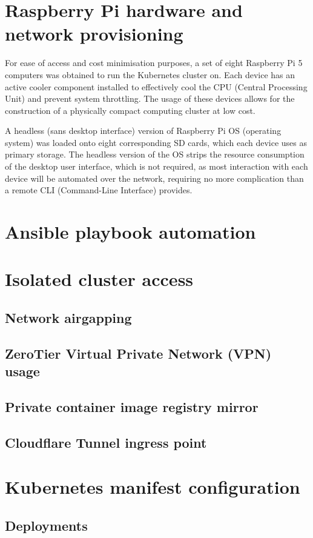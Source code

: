 \section{Raspberry Pi hardware and network provisioning}

For ease of access and cost minimisation purposes, a set of eight Raspberry Pi 5 computers was obtained to run the Kubernetes cluster on. Each device has an active cooler component installed to effectively cool the CPU (Central Processing Unit) and prevent system throttling. The usage of these devices allows for the construction of a physically compact computing cluster at low cost.

A headless (sans desktop interface) version of Raspberry Pi OS (operating system) was loaded onto eight corresponding SD cards, which each device uses as primary storage. The headless version of the OS strips the resource consumption of the desktop user interface, which is not required, as most interaction with each device will be automated over the network, requiring no more complication than a remote CLI (Command-Line Interface) provides.
\section{Ansible playbook automation}
\section{Isolated cluster access}
\subsection{Network airgapping}
\subsection{ZeroTier Virtual Private Network (VPN) usage}
\subsection{Private container image registry mirror}
\subsection{Cloudflare Tunnel ingress point}

\section{Kubernetes manifest configuration}
\subsection{Deployments}
